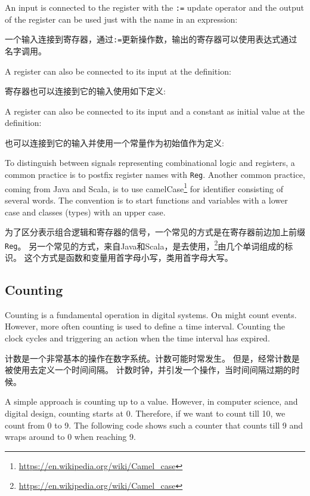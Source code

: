 \documentclass[%
    10pt,
    headinclude, footexclude,
    openright, %
    notitlepage,
    cleardoubleempty,
    headsepline,
    pointlessnumbers,
    bibtotoc, idxtotoc,
    ]{scrbook}
\newcommand{\code}[1]{{\small{\texttt{#1}}}}
\newcommand{\myref}[2]{\href{#1}{#2}}
\renewcommand{\myref}[2]{{#2}{\footnote{\url{#1}}}}
\begin{document}

\noindent An input is connected to the register with the \code{:=} update operator and
the output of the register can be used just with the name in an expression:

一个输入连接到寄存器，通过\code{:=}更新操作数，输出的寄存器可以使用表达式通过名字调用。


\noindent A register can also be connected to its input at the definition:

寄存器也可以连接到它的输入使用如下定义: 


\noindent A register can also be connected to its input and a constant as
initial value at the definition:

也可以连接到它的输入并使用一个常量作为初始值作为定义:


\noindent To distinguish between signals representing combinational logic and registers,
a common practice is to postfix register names with \code{Reg}.
Another common practice, coming from Java and Scala, is to use
\myref{https://en.wikipedia.org/wiki/Camel_case}{camelCase} for
identifier consisting of several words. The convention is to start
functions and variables with a lower case and classes (types) with
an upper case.

为了区分表示组合逻辑和寄存器的信号，一个常见的方式是在寄存器前边加上前缀\code{Reg}。
另一个常见的方式，来自Java和Scala，是去使用\myref{https://en.wikipedia.org/wiki/Camel_case}，由几个单词组成的标识。
这个方式是函数和变量用首字母小写，类用首字母大写。


\subsection{Counting}

Counting is a fundamental operation in digital systems. On might count events.
However, more often counting is used to define a time interval. Counting the
clock cycles and triggering an action when the time interval has expired.

计数是一个非常基本的操作在数字系统。计数可能时常发生。
但是，经常计数是被使用去定义一个时间间隔。
计数时钟，并引发一个操作，当时间间隔过期的时候。


A simple approach is counting up to a value. However, in computer science,
and digital design, counting starts at 0. Therefore, if we want to count till
10, we count from 0 to 9. The following code shows such a counter that counts
till 9 and wraps around to 0 when reaching 9.
\end{document}
